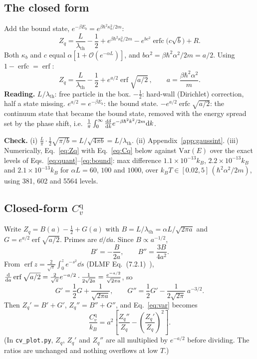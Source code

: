 \documentclass[11pt]{article}
\numberwithin{equation}{section}
\providecommand{\erf}{\operatorname{erf}}
\providecommand{\erfc}{\operatorname{erfc}}
\newcommand{\lth}{\lambda_{\mathrm{th}}}
\newcommand{\Cq}{C_v^{\mathrm{q}}}
\newcommand{\kB}{k_{B}}
\newcommand{\Eu}{\hbar^2\alpha^2/2m}
\begin{document}
\subsection{The closed form}
Add the bound state, $e^{-\beta E_b}=e^{\beta\hbar^2\kappa_b^2/2m}$:
\begin{equation}
Z_q=\frac{L}{\lth}-\frac12+e^{\beta\hbar^2\kappa_b^2/2m}-e^{bc^2}\erfc\big(c\sqrt b\big)+R .
\end{equation}
Both $\kappa_b$ and $c$ equal $\alpha[1+\mathcal O(e^{-\alpha L})]$, and $b\alpha^2=\beta\hbar^2\alpha^2/2m=a/2$. Using $1-\erfc=\erf$:
\begin{equation}
\boxed{\;Z_q=\frac{L}{\lth}-\frac12+e^{a/2}\erf\sqrt{a/2}\,,\qquad a=\frac{\beta\hbar^2\alpha^2}{m}.\;}
\label{eq:Zq}
\end{equation}
\textbf{Reading.} $L/\lth$: free particle in the box. $-\tfrac12$: hard-wall (Dirichlet) correction, half a state missing. $e^{a/2}=e^{-\beta E_b}$: the bound state. $-e^{a/2}\erfc\sqrt{a/2}$: the continuum state that became the bound state, removed with the energy spread set by the phase shift, i.e.\ $\frac1\pi\int_0^\infty\dv{\delta}{k}e^{-\beta\hbar^2k^2/2m}\dd k$.

\begin{checkbox}
\textbf{Check.} (i) $\frac{L}{\pi}\cdot\frac12\sqrt{\pi/b}=L/\sqrt{4\pi b}=L/\lth$. (ii) Appendix~\ref{app:gaussint}. (iii) Numerically, Eq.~\eqref{eq:Zq} with Eq.~\eqref{eq:Cq} below against $\mathrm{Var}(E)$ over the exact levels of Eqs.~\eqref{eq:quant}--\eqref{eq:bound}: max difference $1.1\times10^{-13}\kB$, $2.2\times10^{-13}\kB$ and $2.1\times10^{-13}\kB$ for $\alpha L=60$, $100$ and $1000$, over $\kB T\in[0.02,5]\,(\Eu)$, using 381, 602 and 5564 levels.
\end{checkbox}

\subsection{Closed-form \texorpdfstring{$\Cq$}{Cq}}
Write $Z_q=B(a)-\frac12+G(a)$ with $B=L/\lth=\alpha L/\sqrt{2\pi a}$ and $G=e^{a/2}\erf\sqrt{a/2}$. Primes are $\dd/\dd a$. Since $B\propto a^{-1/2}$,
\begin{equation}
B'=-\frac{B}{2a},\qquad B''=\frac{3B}{4a^2}.
\end{equation}
From $\erf z=\frac{2}{\sqrt\pi}\int_0^ze^{-s^2}\dd s$ (DLMF Eq.~(7.2.1)~\cite{dlmf}), $\dv{a}\erf\sqrt{a/2}=\frac{2}{\sqrt\pi}e^{-a/2}\cdot\frac{1}{2\sqrt{2a}}=\frac{e^{-a/2}}{\sqrt{2\pi a}}$, so
\begin{equation}
G'=\frac12G+\frac{1}{\sqrt{2\pi a}},\qquad G''=\frac12G'-\frac{1}{2\sqrt{2\pi}}\,a^{-3/2}.
\end{equation}
Then $Z_q'=B'+G'$, $Z_q''=B''+G''$, and Eq.~\eqref{eq:var} becomes
\begin{equation}
\boxed{\;\frac{\Cq}{\kB}=a^2\left[\frac{Z_q''}{Z_q}-\left(\frac{Z_q'}{Z_q}\right)^2\right].\;}
\label{eq:Cq}
\end{equation}
(In \texttt{cv\_plot.py}, $Z_q$, $Z_q'$ and $Z_q''$ are all multiplied by $e^{-a/2}$ before dividing. The ratios are unchanged and nothing overflows at low $T$.)
\end{document}
